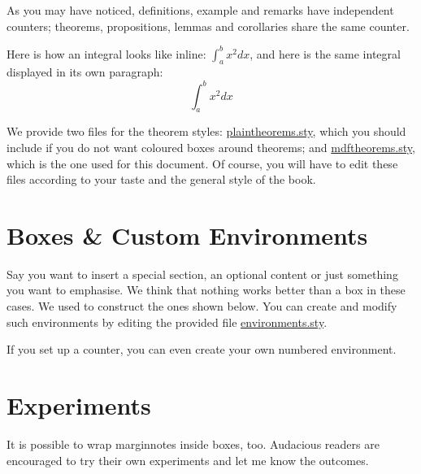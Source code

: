 As you may have noticed, definitions, example and remarks have
independent counters; theorems, propositions, lemmas and corollaries
share the same counter.

\begin{remark}
Here is how an integral looks like inline: $\int_{a}^{b} x^2 dx$, and
here is the same integral displayed in its own paragraph:
\[\int_{a}^{b} x^2 dx\]
\end{remark}

We provide two files for the theorem styles:
\href{style/plaintheorems.sty}{plaintheorems.sty}, which you should
include if you do not want coloured boxes around theorems; and
\href{style/mdftheorems.sty}{mdftheorems.sty}, which is the one used for
this document. Of course,
you will have to edit these files according to your taste and the
general style of the book.

\section[Boxes \& Environments]{Boxes \& Custom Environments
}

Say you want to insert a special section, an optional content or just
something you want to emphasise. We think that nothing works better than
a box in these cases. We used  to construct the ones
shown below. You can create and modify such environments by editing the
provided file \href{style/environments.sty}{environments.sty}.

\begin{kaobox}[frametitle=Title of the box]
\blindtext
\end{kaobox}

If you set up a counter, you can even create your own numbered
environment.

\begin{kaocounter}
	\blindtext
\end{kaocounter}

\section{Experiments}

It is possible to wrap marginnotes inside boxes, too. Audacious readers
are encouraged to try their own experiments and let me know the
outcomes.

